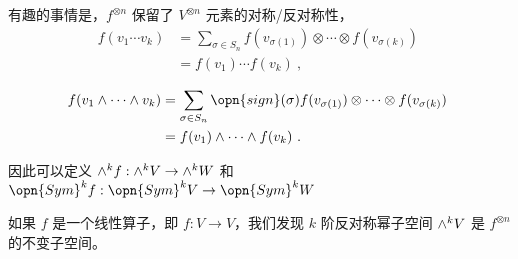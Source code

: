有趣的事情是，$f^{\otimes n}$ 保留了 $V^{\otimes n}$ 元素的对称/反对称性，
\begin{equation}
\begin{aligned}
f(v_1 \cdots v_k) &= \sum_{\sigma \in S_n} f(v_{\sigma(1)}) \otimes \cdots \otimes f(v_{\sigma(k)}) \\
&= f(v_1) \cdots f(v_k)~,
\end{aligned}~
\end{equation}

\begin{equation}
\begin{aligned}
f(v_1 \wedge \cdots \wedge v_k) &= \sum_{\sigma \in S_n} \opn{sign}(\sigma) f(v_{\sigma(1)}) \otimes \cdots \otimes f(v_{\sigma(k)}) \\
&= f(v_1) \wedge \cdots \wedge f(v_k)~.
\end{aligned}~
\end{equation}

因此可以定义 ${\large \wedge}^k f: {\large \wedge}^k V \to {\large \wedge}^k W$ 和 $\opn{Sym}^k f: \opn{Sym}^k V \to \opn{Sym}^k W$

如果 $f$ 是一个线性算子，即 $f: V \to V$，我们发现 $k$ 阶反对称幂子空间 ${\large \wedge}^k V$ 是 $f^{\otimes n}$ 的不变子空间。